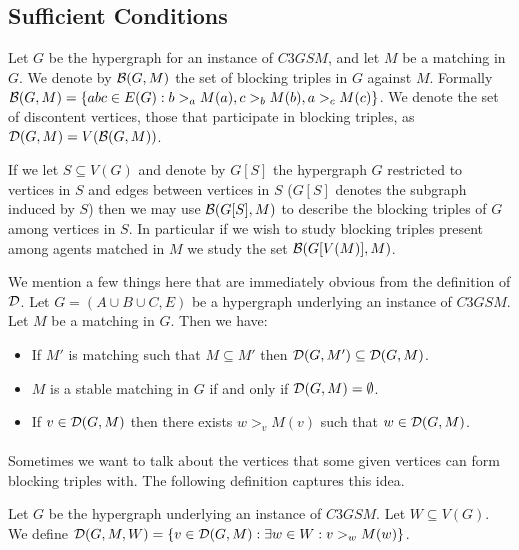 \subsection{Sufficient Conditions}\label{subsec:sufficient}
\begin{definition}
Let $G$ be the hypergraph for an instance of $C3GSM$, and let $M$ be a matching in $G$. We denote by $\mathcal{B}(G,M)$ the set of blocking triples in $G$ against $M$. Formally $\mathcal{B}(G,M) = \{abc \in E(G): b>_a M(a), c>_b M(b), a>_c M(c)\}$. We denote the set of discontent vertices, those that participate in blocking triples, as $\mathcal{D}(G,M) = V(\mathcal{B}(G,M))$.
\end{definition}
\begin{note}
If we let $S \subseteq V(G)$ and denote by $G[S]$ the hypergraph $G$ restricted to vertices in $S$ and edges between vertices in $S$ ($G[S]$ denotes the subgraph induced by $S$) then we may use $\mathcal{B}(G[S],M)$ to describe the blocking triples of $G$ among vertices in $S$. In particular if we wish to study blocking triples present among agents matched in $M$ we study the set $\mathcal{B}(G[V(M)], M)$.
\end{note}
\begin{note}
We mention a few things here that are immediately obvious from the definition of $\mathcal{D}$. Let $G=(A\cup B \cup C, E)$ be a hypergraph underlying an instance of $C3GSM$. Let $M$ be a matching in $G$. Then we have:
\begin{itemize}
\item If $M'$ is matching such that $M \subseteq M'$ then $\mathcal{D}(G,M') \subseteq \mathcal{D}(G,M)$.
\item $M$ is a stable matching in $G$ if and only if $\mathcal{D}(G, M) = \emptyset$.
\item If $v \in \mathcal{D}(G,M)$ then there exists $w >_v M(v)$ such that $w \in \mathcal{D}(G,M)$.
\end{itemize}
\end{note}
\paragraph{}
Sometimes we want to talk about the vertices that some given vertices can form blocking triples with. The following definition captures this idea.
\begin{definition}
Let $G$ be the hypergraph underlying an instance of $C3GSM$. Let $W \subseteq V(G)$. We define $\mathcal{D}(G,M, W) = \{v \in \mathcal{D}(G,M): \exists w\in W: v>_w M(w) \}$.
\end{definition}
